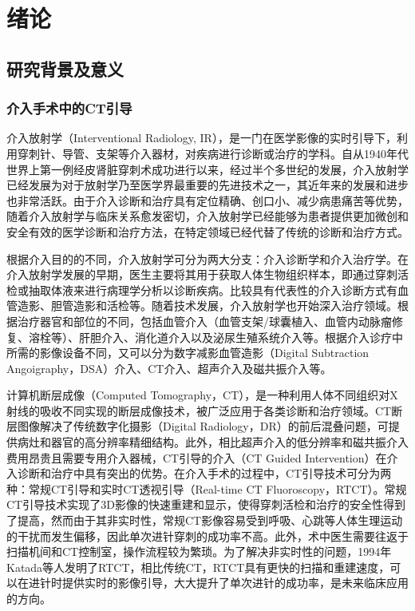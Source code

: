 
\chapter{绪论}

\section{研究背景及意义}
\subsection{介入手术中的CT引导}
介入放射学（Interventional Radiology, IR），是一门在医学影像的实时引导下，利用穿刺针、导管、支架等介入器材，对疾病进行诊断或治疗的学科\cite{TengGaoJunJieRuZhiLiaoXue2022}。自从1940年代世界上第一例经皮肾脏穿刺术成功进行以来，经过半个多世纪的发展，介入放射学已经发展为对于放射学乃至医学界最重要的先进技术之一，其近年来的发展和进步也非常活跃\cite{HuXiaoKunZhangFuJunXiaoYueYongCTJieRuZhiLiaoXue2020}。由于介入诊断和治疗具有定位精确、创口小、减少病患痛苦等优势，随着介入放射学与临床关系愈发密切，介入放射学已经能够为患者提供更加微创和安全有效的医学诊断和治疗方法，在特定领域已经代替了传统的诊断和治疗方式。

根据介入目的的不同，介入放射学可分为两大分支：介入诊断学和介入治疗学。在介入放射学发展的早期，医生主要将其用于获取人体生物组织样本，即通过穿刺活检或抽取体液来进行病理学分析以诊断疾病。比较具有代表性的介入诊断方式有血管造影、胆管造影和活检等。随着技术发展，介入放射学也开始深入治疗领域。根据治疗器官和部位的不同，包括血管介入（血管支架/球囊植入、血管内动脉瘤修复、溶栓等）、肝胆介入、消化道介入以及泌尿生殖系统介入等。根据介入诊疗中所需的影像设备不同，又可以分为数字减影血管造影（Digital Subtraction Angoigraphy，DSA）介入、CT介入、超声介入及磁共振介入等。

计算机断层成像（Computed Tomography，CT），是一种利用人体不同组织对X射线的吸收不同实现的断层成像技术，被广泛应用于各类诊断和治疗领域。CT断层图像解决了传统数字化摄影（Digital Radiology，DR）的前后混叠问题，可提供病灶和器官的高分辨率精细结构。此外，相比超声介入的低分辨率和磁共振介入费用昂贵且需要专用介入器械，CT引导的介入（CT Guided Intervention）在介入诊断和治疗中具有突出的优势。在介入手术的过程中，CT引导技术可分为两种：常规CT引导和实时CT透视引导（Real-time CT Fluoroscopy，RTCT）。常规CT引导技术实现了3D影像的快速重建和显示，使得穿刺活检和治疗的安全性得到了提高，然而由于其非实时性，常规CT影像容易受到呼吸、心跳等人体生理运动的干扰而发生偏移，因此单次进针穿刺的成功率不高。此外，术中医生需要往返于扫描机间和CT控制室，操作流程较为繁琐。为了解决非实时性的问题，1994年Katada等人发明了RTCT，相比传统CT，RTCT具有更快的扫描和重建速度，可以在进针时提供实时的影像引导，大大提升了单次进针的成功率，是未来临床应用的方向\cite{HuXiaoKunZhangFuJunXiaoYueYongCTJieRuZhiLiaoXue2020,katadaDevelopmentRealtimeCT1994}。

